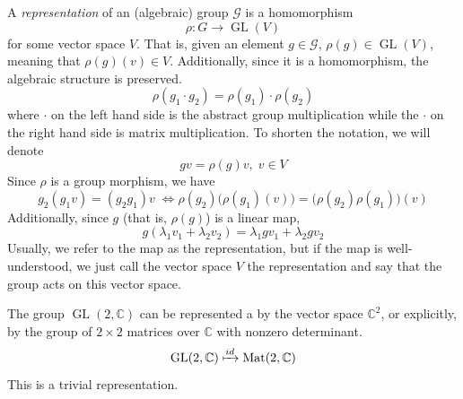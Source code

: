 \documentclass{article}
\DeclareMathOperator{\GL}{GL}
\begin{document}
  \begin{definition}
  A \textit{representation} of an (algebraic) group $\mathcal{G}$ is a homomorphism 
  \[\rho: G \longrightarrow \GL(V)\]
  for some vector space $V$. That is, given an element $g \in \mathcal{G}$, $\rho(g) \in \GL (V)$, meaning that $\rho(g)(v) \in V$. Additionally, since it is a homomorphism, the algebraic structure is preserved. 
  \[\rho(g_1 \cdot g_2) = \rho(g_1) \cdot \rho(g_2)\]
  where $\cdot$ on the left hand side is the abstract group multiplication while the $\cdot$ on the right hand side is matrix multiplication. To shorten the notation, we will denote 
  \[g v = \rho(g) v, \; v \in V\]
  Since $\rho$ is a group morphism, we have 
  \[g_2 (g_1 v) = (g_2 g_1) v \; \iff \rho(g_2) \big( \rho(g_1) (v) \big) = \big( \rho(g_2) \rho(g_1) \big) (v)\]
  Additionally, since $g$ (that is, $\rho(g)$) is a linear map, 
  \[g(\lambda_1 v_1 + \lambda_2 v_2) = \lambda_1 g v_1 + \lambda_2 g v_2\]
  Usually, we refer to the map as the representation, but if the map is well-understood, we just call the vector space $V$ the representation and say that the group acts on this vector space. 
  \end{definition}

  \begin{example}
  The group $\GL(2, \mathbb{C})$ can be represented a by the vector space $\mathbb{C}^2$, or explicitly, by the group of $2 \times 2$ matrices over $\mathbb{C}$ with nonzero determinant.
  \[\GL(2, \mathbb{C}) \xmapsto{id} \text{Mat}(2, \mathbb{C})\]
  This is a trivial representation. 
  \end{example}
\end{document}
